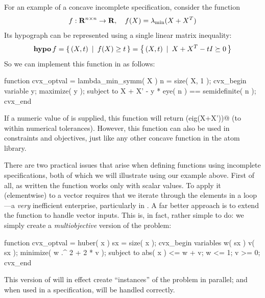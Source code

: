 \documentclass[12pt]{article}
\begin{document}
For an example of a concave incomplete specification, consider the function
\begin{equation}
	f:\R^{n\times n}\rightarrow\R, \quad f(X) = \lambda_{\min}(X+X^T)
\end{equation}
Its hypograph can be represented using a single linear matrix inequality:
\begin{equation}
	\operatorname{\textbf{hypo}} f = \left\{\, (X,t) \,~|~\, f(X) \geq t \,\right\} = \left\{\, (X,t) \,~|~\, X + X^T - t I \succeq 0 \,\right\}
\end{equation}
So we can implement this function in \cvx as follows:
\begin{code}
	function cvx_optval = lambda_min_symm( X )
	n = size( X, 1 );
	cvx_begin
	    variable y;
	    maximize( y );
	    subject to
	        X + X' - y * eye( n ) == semidefinite( n );
	cvx_end
\end{code}
If a numeric value of \verb@X@ is supplied, this function will return
\verb@min(eig(X+X'))@ (to within numerical tolerances). However, this function
can also be used in \cvx constraints and objectives, just like any other concave
function in the atom library.

There are two practical issues that arise when defining functions
using incomplete specifications, both of which we will illustrate using
our \verb@huber@ example above. First of all, as written the function works
only with scalar values. To apply it (elementwise) 
to a vector requires that we iterate
through the elements in a \verb@for@ loop---a \emph{very} 
inefficient enterprise,
particularly in \cvx. A far better 
approach is to extend the \verb@huber@ function to handle vector inputs. This
is, in fact, rather simple to do: we simply create a \emph{multiobjective}
version of the problem:
\begin{code}
	function cvx_optval = huber( x )
	sx = size( x );
	cvx_begin
	    variables w( sx ) v( sx );
	    minimize( w .^ 2 + 2 * v );
	    subject to
	        abs( x ) <= w + v;
	        w <= 1; v >= 0;
	cvx_end
\end{code}
This version of \verb@huber@ will in effect create \verb@sx@ ``instances''
of the problem in parallel; and when used in a \cvx specification,
will be handled correctly.
\end{document}
